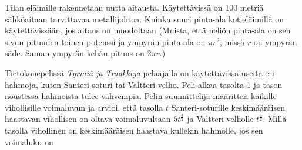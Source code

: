 \begin{tehtavasivu}
\begin{tehtava}%
Tilan eläimille rakennetaan uutta aitausta. Käytettävissä on 100 metriä sähköaitaan tarvittavaa metallijohtoa. Kuinka suuri pinta-ala kotieläimillä on käytettävissään, jos aitaus on muodoltaan
(Muista, että neliön pinta-ala on sen sivun pituuden toinen potenssi ja ympyrän pinta-ala on \(\pi r^2\), missä \(r\) on ympyrän säde. Saman ympyrän kehän pituus on \(2\pi r\).)
\begin{vastaus}
\end{vastaus}
\end{tehtava}

\begin{tehtava}
Tietokonepelissä \emph{Tyrmiä ja Traakkeja} pelaajalla on käytettävissä useita eri hahmoja,
kuten Santeri-soturi tai Valtteri-velho. Peli alkaa tasolta 1 ja tason noustessa hahmoista
tulee vahvempia. Pelin suunnittelija määrittää kaikille vihollisille voimaluvun ja arvioi,
että tasolla $t$ Santeri-soturille keskimääräisen haastavan vihollisen on oltava
voimaluvultaan $5t^{\frac{3}{2}}$ ja Valtteri-velholle $t^{\frac{5}{2}}$. Millä tasolla
vihollinen on keskimääräisen haastava kullekin hahmolle, jos sen voimaluku on
\begin{vastaus}
\end{vastaus}
\end{tehtava}

\end{tehtavasivu}
